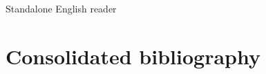 \begin{center}
\large Standalone English reader
\end{center}

\tableofcontents


\setcounter{section}{7}









\clearpage
{}
{}
\section*{Consolidated bibliography}
\nocite{*}




